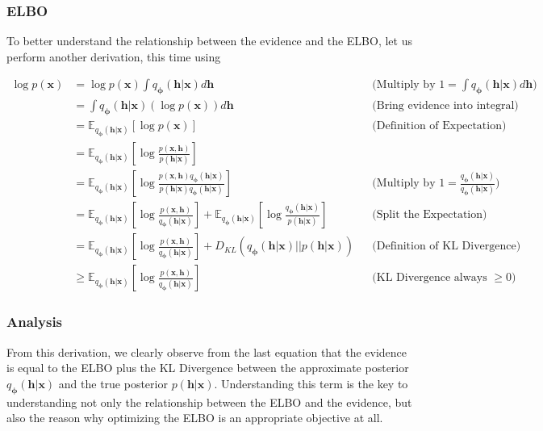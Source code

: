 \documentclass{beamer}
\begin{document}
\begin{frame}
\frametitle{ELBO}

To better understand the relationship between the evidence and the ELBO, let us perform another derivation, this time using

\begin{align*}
\log p(\bm{x}) & = \log p(\bm{x}) \int q_{\bm{\phi}}(\bm{h}|\bm{x})d\bm{h} && \text{(Multiply by $1 = \int q_{\bm{\phi}}(\bm{h}|\bm{x})d\bm{h}$)}\\
          & = \int q_{\bm{\phi}}(\bm{h}|\bm{x})(\log p(\bm{x}))d\bm{h} && \text{(Bring evidence into integral)}\\
          & = \mathbb{E}_{q_{\bm{\phi}}(\bm{h}|\bm{x})}\left[\log p(\bm{x})\right] && \text{(Definition of Expectation)}\\
          & = \mathbb{E}_{q_{\bm{\phi}}(\bm{h}|\bm{x})}\left[\log\frac{p(\bm{x}, \bm{h})}{p(\bm{h}|\bm{x})}\right]&& \\
          & = \mathbb{E}_{q_{\bm{\phi}}(\bm{h}|\bm{x})}\left[\log\frac{p(\bm{x}, \bm{h})q_{\bm{\phi}}(\bm{h}|\bm{x})}{p(\bm{h}|\bm{x})q_{\bm{\phi}}(\bm{h}|\bm{x})}\right]&& \text{(Multiply by $1 = \frac{q_{\bm{\phi}}(\bm{h}|\bm{x})}{q_{\bm{\phi}}(\bm{h}|\bm{x})}$)}\\
          & = \mathbb{E}_{q_{\bm{\phi}}(\bm{h}|\bm{x})}\left[\log\frac{p(\bm{x}, \bm{h})}{q_{\bm{\phi}}(\bm{h}|\bm{x})}\right] + \mathbb{E}_{q_{\bm{\phi}}(\bm{h}|\bm{x})}\left[\log\frac{q_{\bm{\phi}}(\bm{h}|\bm{x})}{p(\bm{h}|\bm{x})}\right] && \text{(Split the Expectation)}\\
          & = \mathbb{E}_{q_{\bm{\phi}}(\bm{h}|\bm{x})}\left[\log\frac{p(\bm{x}, \bm{h})}{q_{\bm{\phi}}(\bm{h}|\bm{x})}\right] +
	  D_{KL}(q_{\bm{\phi}}(\bm{h}|\bm{x})\vert\vert p(\bm{h}|\bm{x}))  && \text{(Definition of KL Divergence)}\\
          & \geq \mathbb{E}_{q_{\bm{\phi}}(\bm{h}|\bm{x})}\left[\log\frac{p(\bm{x}, \bm{h})}{q_{\bm{\phi}}(\bm{h}|\bm{x})}\right]  && \text{(KL Divergence always $\geq 0$)}
\end{align*}
\end{frame}

\begin{frame}
\frametitle{Analysis}

From this derivation, we clearly observe from the last equation
that the evidence is equal to the ELBO plus the KL Divergence between
the approximate posterior $q_{\bm{\phi}}(\bm{h}|\bm{x})$ and the true
posterior $p(\bm{h}|\bm{x})$.  Understanding this term is the
key to understanding not only the relationship between the ELBO and
the evidence, but also the reason why optimizing the ELBO is an
appropriate objective at all.
\end{frame}
\end{document}
